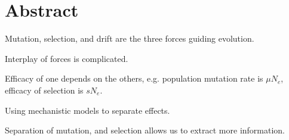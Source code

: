 \chapter*{Abstract}\label{ch:abstract}
Mutation, selection, and drift are the three forces guiding evolution.

Interplay of forces is complicated.

Efficacy of one depends on the others, e.g. population mutation rate is $\mu N_e$, efficacy of selection is $sN_e$.

Using mechanistic models to separate effects.

Separation of mutation, and selection allows us to extract more information.